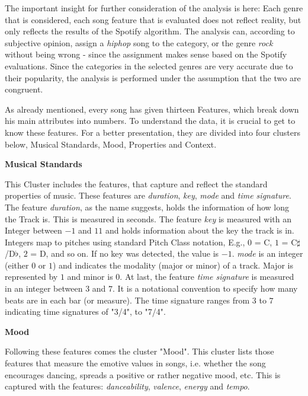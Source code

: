 The important insight for further consideration of the analysis is here:
Each genre that is considered, each song feature that is evaluated does not reflect reality, 
but only reflects the results of the Spotify algorithm. The analysis can,
according to subjective opinion, assign a \emph{hiphop} song to the category, 
or the genre \emph{rock} without being wrong - since the assignment makes sense based on the Spotify evaluations. 
Since the categories in the selected genres are very accurate due to their popularity,
the analysis is performed under the assumption that the two are congruent. 

As already mentioned, every song has given thirteen Features, which break down his main attributes into numbers.
To understand the data, it is crucial to get to know these features.
For a better presentation, they are divided into four clusters below, 
Musical Standards, Mood, Properties and Context.

\textbf{Musical Standards}

This Cluster includes the features, that capture and reflect the standard properties of music. 
These features are \emph{duration}, \emph{key}, \emph{mode} and \emph{time signature}. 
The feature \emph{duration}, as the name suggests, holds the information of how long the Track is.
This is measured in seconds. The feature \emph{key} is measured with an Integer between \(-1\) and \(11\) and 
holds information about the key the track is in. Integers map to pitches using standard Pitch Class notation, E.g., \(0\) = C, \(1\) = C\(\sharp\) /D\(\flat\), \(2\) = D, and so on. 
If no key was detected, the value is \(-1\).
\emph{mode} is an integer (either \(0\) or \(1\)) and indicates the modality (major or minor) of a track. Major is represented by \(1\) and minor is \(0\). 
At last, the feature \emph{time signature} is measured in an integer between \(3\) and \(7\).
It is a notational convention to specify how many beats are in each bar (or measure). 
The time signature ranges from \(3\) to \(7\) indicating time signatures of "3/4", to "7/4". \cite[]{Features}

\textbf{Mood}

Following these features comes the cluster "Mood".
This cluster lists those features that measure the emotive values in songs, 
i.e. whether the song encourages dancing, spreads a positive or rather negative mood,
etc. This is captured with the features: \emph{danceability}, \emph{valence}, \emph{energy} and \emph{tempo}.


